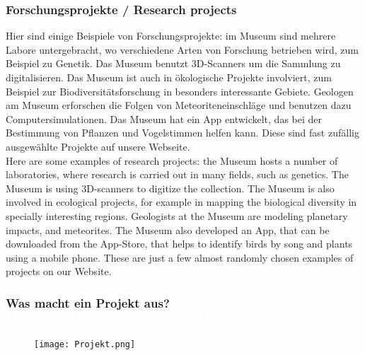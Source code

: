 {\scriptsize
\begin{frame}
  \frametitle{Forschungsprojekte / \textcolor{mfn_green}{Research projects}}
  Hier sind einige Beispiele von Forschungsprojekte: im Museum sind mehrere Labore untergebracht, wo verschiedene Arten von Forschung betrieben wird, zum Beispiel zu Genetik. Das Museum benutzt 3D-Scanners um die Sammlung zu digitalisieren. Das Museum ist auch in ökologische Projekte involviert, zum Beispiel zur Biodiversitätsforschung in besonders interessante Gebiete. Geologen am Museum erforschen die Folgen von Meteoriteneinschläge und benutzen dazu Computersimulationen. Das Museum hat ein App entwickelt, das bei der Bestimmung von Pflanzen und Vogelstimmen helfen kann. Diese sind fast zufällig ausgewählte Projekte auf unsere Webseite.\\
  \bigskip
  \textcolor{mfn_green}{Here are some examples of research projects: the Museum hosts a number of laboratories, where research is carried out in many fields, such as genetics. The Museum is using 3D-scanners to digitize the collection. The Museum is also involved in ecological projects, for example in mapping the biological diversity in specially interesting regions. Geologists at the Museum are modeling planetary impacts, and meteorites. The Museum also developed an App, that can be downloaded from the App-Store, that helps to identify birds by song and plants using a mobile phone. These are just a few almost randomly chosen examples of projects on our Website.}
\end{frame}
}
{
\begin{frame}
  \frametitle{Was macht ein Projekt aus? \\ \textcolor{white}{What does it take to launch a project?}}
  \begin{figure}
  \texttt{[image: Projekt.png]}
  \end{figure}
  \bigskip
\end{frame}
}


